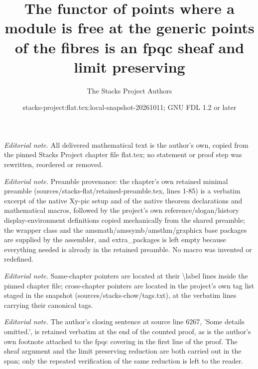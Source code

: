 \documentclass[10pt,a4paper]{amsart}
\title{The functor of points where a module is free at the generic points of the fibres is an fpqc sheaf and limit preserving}
\author{The Stacks Project Authors}
\date{stacks-project:flat.tex:local-snapshot-20261011; GNU FDL 1.2 or later}
\theoremstyle{plain}
\theoremstyle{definition}
\theoremstyle{remark}
\numberwithin{equation}{subsection}
\begin{document}
\maketitle
\noindent\textit{Editorial note.} All delivered mathematical text is the author's own, copied from the pinned Stacks Project chapter file flat.tex; no statement or proof step was rewritten, reordered or removed.\par\medskip
\noindent\textit{Editorial note.} Preamble provenance: the chapter's own retained minimal preamble (sources/stacks-flat/retained-preamble.tex, lines 1-85) is a verbatim excerpt of the native Xy-pic setup and of the native theorem declarations and mathematical macros, followed by the project's own reference/slogan/history display-environment definitions copied mechanically from the shared preamble; the wrapper class and the amsmath/amssymb/amsthm/graphicx base packages are supplied by the assembler, and extra\_packages is left empty because everything needed is already in the retained preamble. No macro was invented or redefined.\par\medskip
\noindent\textit{Editorial note.} Same-chapter pointers are located at their \textbackslash{}label lines inside the pinned chapter file; cross-chapter pointers are located in the project's own tag list staged in the snapshot (sources/stacks-chow/tags.txt), at the verbatim lines carrying their canonical tags.\par\medskip
\noindent\textit{Editorial note.} The author's closing sentence at source line 6267, 'Some details omitted.', is retained verbatim at the end of the counted proof, as is the author's own footnote attached to the fpqc covering in the first line of the proof. The sheaf argument and the limit preserving reduction are both carried out in the span; only the repeated verification of the same reduction is left to the reader.\par\medskip
\end{document}
